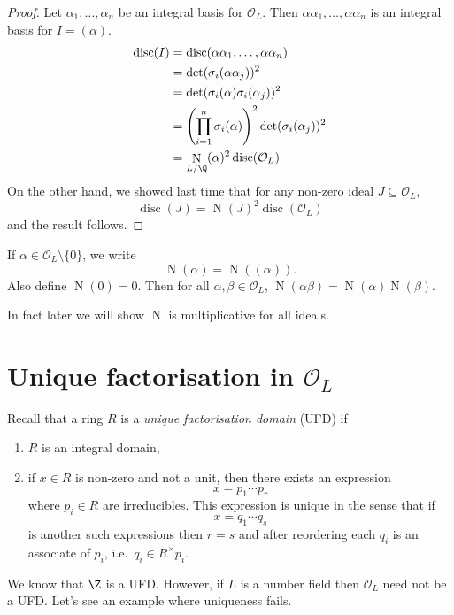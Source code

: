 \documentclass[a4paper]{article}
\renewcommand*{\O}{\mathcal{O}}
\DeclareMathOperator{\n}{N}
\DeclareMathOperator{\disc}{disc}
\begin{document}
\begin{proof}
  Let \(\alpha_1, \dots, \alpha_n\) be an integral basis for \(\O_L\). Then \(\alpha\alpha_1, \dots, \alpha\alpha_n\) is an integral basis for \(I = (\alpha)\).
  \begin{align*}
    \disc(I) 
    &= \disc(\alpha\alpha_1, \dots, \alpha\alpha_n) \\
    &= \det(\sigma_i(\alpha\alpha_j))^2 \\
    &= \det (\sigma_i(\alpha)\sigma_i(\alpha_j))^2 \\
    &= \left( \prod_{i = 1}^n \sigma_i(\alpha) \right)^2 \det(\sigma_i(\alpha_j))^2 \\
    &= \n_{L/\Q}(\alpha)^2 \disc(\O_L)
  \end{align*}
  On the other hand, we showed last time that for any non-zero ideal \(J \subseteq \O_L\),
  \[
    \disc(J) = \n(J)^2 \disc(\O_L)
  \]
  and the result follows.
\end{proof}

\begin{notation}
  If \(\alpha \in \O_L \setminus \{0\}\), we write
  \[
    \n(\alpha) = \n((\alpha)).
  \]
  Also define \(\n(0) = 0\). Then for all \(\alpha, \beta \in \O_L\), \(\n(\alpha\beta) = \n(\alpha)\n(\beta)\).
\end{notation}

In fact later we will show \(\n\) is multiplicative for all ideals.

\section{Unique factorisation in \texorpdfstring{\(\O_L\)}{O\_L}}

Recall that a ring \(R\) is a \emph{unique factorisation domain} (UFD) if
\begin{enumerate}
\item \(R\) is an integral domain,
\item if \(x \in R\) is non-zero and not a unit, then there exists an expression
  \[
    x = p_1 \cdots p_r
  \]
  where \(p_i \in R\) are irreducibles. This expression is unique in the sense that if
  \[
    x = q_1 \cdots q_s
  \]
  is another such expressions then \(r = s\) and after reordering each \(q_i\) is an associate of \(p_i\), i.e.\ \(q_i \in R^\times p_i\).
\end{enumerate}

We know that \(\Z\) is a UFD. However, if \(L\) is a number field then \(\O_L\) need not be a UFD. Let's see an example where uniqueness fails.
\end{document}
